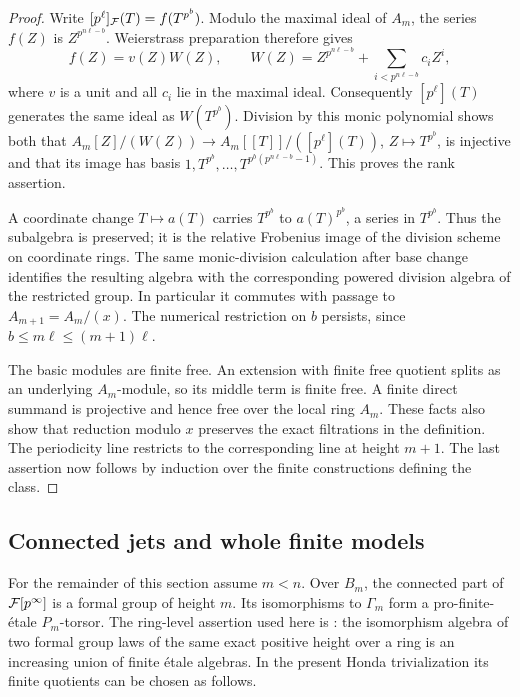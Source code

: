 \begin{proof}
Write $[p^\ell]_{\mathcal F}(T)=f(T^{p^b})$.  Modulo the maximal ideal of
$A_m$, the series $f(Z)$ is $Z^{p^{n\ell-b}}$.  Weierstrass preparation
therefore gives
\[
 f(Z)=v(Z)W(Z),\qquad
 W(Z)=Z^{p^{n\ell-b}}+\sum_{i<p^{n\ell-b}}c_iZ^i,
\]
where $v$ is a unit and all $c_i$ lie in the maximal ideal.  Consequently
$[p^\ell](T)$ generates the same ideal as $W(T^{p^b})$.
Division by this monic polynomial shows both that
$A_m[Z]/(W(Z))\longrightarrow A_m[[T]]/([p^\ell](T))$, $Z\mapsto T^{p^b}$,
is injective and that its image has basis
$1,T^{p^b},\ldots,T^{p^b(p^{n\ell-b}-1)}$.  This proves the rank assertion.

A coordinate change $T\mapsto a(T)$ carries $T^{p^b}$ to
$a(T)^{p^b}$, a series in $T^{p^b}$.  Thus the subalgebra is preserved;
it is the relative Frobenius image of the division scheme on coordinate
rings.  The same monic-division calculation after base change identifies
the resulting algebra with the corresponding powered division algebra
of the restricted group.  In particular it commutes with passage to
$A_{m+1}=A_m/(x)$.  The numerical restriction on $b$ persists, since
$b\leq m\ell\leq(m+1)\ell$.

The basic modules are finite free.  An extension with finite free
quotient splits as an underlying $A_m$-module, so its middle term is
finite free.  A finite direct summand is projective and hence free over
the local ring $A_m$.  These facts also show that reduction modulo $x$
preserves the exact filtrations in the definition.  The periodicity line
restricts to the corresponding line at height $m+1$.  The last assertion
now follows by induction over the finite constructions defining the
class.
\end{proof}

\subsection{Connected jets and whole finite models}

For the remainder of this section assume $m<n$.
Over $B_m$, the connected part of $\mathcal F[p^\infty]$ is a formal group of
height $m$.  Its isomorphisms to $\Gamma_m$ form a pro-finite-\'{e}tale
$P_m$-torsor.  The ring-level assertion used here is
\citet[Lecture~14, Theorem~1]{lurieFormalGroups}: the isomorphism algebra
of two formal group laws of the same exact positive height over a ring
is an increasing union of finite \'{e}tale algebras.  In the present
Honda trivialization its finite quotients can be chosen as follows.

